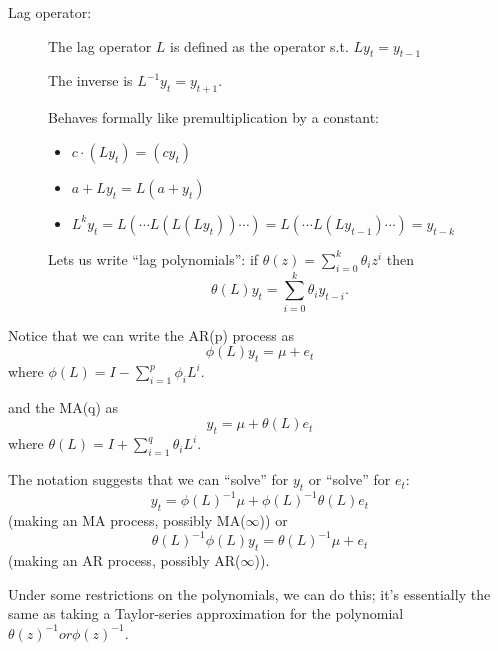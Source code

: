 \begin{description}
\item[Lag operator:]

  The lag operator $L$ is defined as the operator s.t. $L y_t =
  y_{t-1}$

  The inverse is $L^{-1} y_t = y_{t+1}$.

  Behaves formally like premultiplication by a constant:
  \begin{itemize}
  \item $c \cdot (L y_t) = (c y_t)$
  \item $a + L y_t = L (a + y_t)$
  \item $L^k y_t = L(\cdots L(L(L y_t)) \cdots) = L(\cdots L(L y_{t-1}) \cdots) = y_{t-k}$
  \end{itemize}
  Lets us write ``lag polynomials'':
  if $\theta(z) = \sum_{i=0}^k \theta_i z^i$ then
  \[\theta(L) y_t = \sum_{i=0}^k \theta_i y_{t-i}.\]
\end{description}

Notice that we can write the AR(p) process as
\[\phi(L) y_{t} = \mu + e_t \]
where $\phi(L) = I - \sum_{i=1}^p \phi_i L^i$.

and the MA(q) as
\[y_t = \mu + \theta(L) e_t\]
where $\theta(L) = I + \sum_{i=1}^q \theta_i L^i$.

The notation suggests that we can ``solve'' for $y_t$ or ``solve'' for
$e_t$:
\[y_t = \phi(L)^{-1} \mu + \phi(L)^{-1} \theta(L) e_t\]
(making an MA process, possibly MA($\infty$)) or
\[\theta(L)^{-1} \phi(L) y_t = \theta(L)^{-1} \mu + e_t\]
(making an AR process, possibly AR($\infty$)).

Under some restrictions on the polynomials, we can do this; it's
essentially the same as taking a Taylor-series approximation for the
polynomial $\theta(z)^{-1} or \phi(z)^{-1}$.

